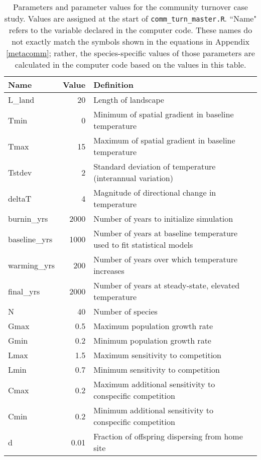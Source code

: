 \documentclass[11pt]{article}
\begin{document}
\renewcommand{\thetable}{SM-\arabic{table}}

\begin{table}[htp]
	\caption{\label{tab:comm-turn-pars}Parameters and parameter values for the community turnover case study. Values are assigned at
		the start of \texttt{comm\_turn\_master.R}. ``Name" refers to the variable declared in the computer code. These names do not exactly 
		match the symbols shown in the equations in Appendix \ref{metacomm}; rather, the species-specific values of those parameters are calculated in the computer code based on the values in this table.  }
	\centering
	\smallskip 
	\begin{tabular}{lrl}
		\hline
		Name & Value & Definition \\
		\hline
		L\_land & 20 & Length of landscape \\
		Tmin & 0 &  Minimum of spatial gradient in baseline temperature \\ 
		Tmax & 15 &  Maximum of spatial gradient in baseline temperature \\
		Tstdev & 2 &  Standard deviation of temperature (interannual variation) \\
		deltaT & 4  & Magnitude of directional change in temperature \\
		burnin\_yrs & 2000 & Number of years to initialize simulation \\
		baseline\_yrs & 1000  & Number of years at baseline temperature used to fit statistical models \\
		warming\_yrs  & 200 & Number of years over which temperature increases \\
		final\_yrs & 2000  & Number of years at steady-state, elevated temperature \\
		\hline
		N & 40 & Number of species \\
		Gmax & 0.5 & Maximum population growth rate \\
		Gmin & 0.2 & Minimum population growth rate \\
		Lmax & 1.5 & Maximum sensitivity to competition \\
		Lmin & 0.7 & Minimum sensitivity to competition  \\
		Cmax & 0.2 & Maximum additional sensitivity to conspecific competition \\
		Cmin & 0.2 & Minimum additional sensitivity to conspecific competition \\
		d & 0.01 &  Fraction of offspring dispersing from home site \\
		\hline
	\end{tabular}
\end{table}
\end{document}
